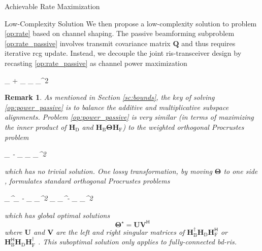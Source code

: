 \documentclass[journal]{IEEEtran}
\newtheorem{remark}{Remark}
\begin{document}
\begin{section}{Achievable Rate Maximization}
	\begin{subsection}{Low-Complexity Solution}\label{sc:low_complexity}
		We then propose a low-complexity solution to problem \eqref{op:rate} based on channel shaping.
		The passive beamforming subproblem \eqref{op:rate_passive} involves transmit covariance matrix $\mathbf{Q}$ and thus requires iterative \gls{rcg} update.
		Instead, we decouple the joint \gls{ris}-transceiver design by recasting \eqref{op:rate_passive} as channel power maximization
		\begin{maxi!}
			{\scriptstyle{\mathbf{\Theta}}}{\lVert {}_ + _ \mathbf{\Theta} _ \rVert _^2}{\label{op:power_passive}}{\label{ob:power_passive}}
		\end{maxi!}
		\begin{remark}
			As mentioned in Section \ref{sc:bounds}, the key of solving \eqref{op:power_passive} is to balance the additive and multiplicative subspace alignments.
			Problem \eqref{op:power_passive} is very similar (in terms of maximizing the inner product of $\mathbf{H}_\mathrm{D}$ and $\mathbf{H}_\mathrm{B} \mathbf{\Theta} \mathbf{H}_\mathrm{F}$) to the weighted orthogonal Procrustes problem \cite{Gower2004}
			\begin{mini!}
				{\scriptstyle{\mathbf{\Theta}}}{\lVert {}_ - _ \mathbf{\Theta} _\mathrm{F} \rVert _^2}{\label{op:weighted_orthogonal_procrustes}}{}
			\end{mini!}
			which has no trivial solution.
			One lossy transformation, by moving $\mathbf{\Theta}$ to one side \cite{Bell2003}, formulates standard orthogonal Procrustes problems
			\begin{mini!}
				{\scriptstyle{\mathbf{\Theta}}}{\lVert {}_^\dagger {}_ - \mathbf{\Theta} _\mathrm{F} \rVert _^2  \lVert \mathbf{H}_ _^\dagger - _ \mathbf{\Theta} \rVert _^2}{\label{op:standard_orthogonal_procrustes}}{}
				\addConstraint{\mathbf{\Theta}^\mathsf{H} \mathbf{\Theta}=\mathbf{I},}{}{}
			\end{mini!}
			which has global optimal solutions
			\begin{equation}
				\mathbf{\Theta}^\star = \mathbf{U} \mathbf{V}^\mathsf{H}
				\label{eq:orthogonal_procrustes_solution}
			\end{equation}
			where $\mathbf{U}$ and $\mathbf{V}$ are the left and right singular matrices of $\mathbf{H}_\mathrm{B}^\dagger \mathbf{H}_\mathrm{D} \mathbf{H}_\mathrm{F}^\mathsf{H}$ or $\mathbf{H}_\mathrm{B}^\mathsf{H} \mathbf{H}_\mathrm{D} \mathbf{H}_\mathrm{F}^\dagger$ \cite{Golub2013}.
			This suboptimal solution only applies to fully-connected \gls{bd}-\gls{ris}.
		\end{remark}


\end{subsection}
\end{section}
\end{document}
